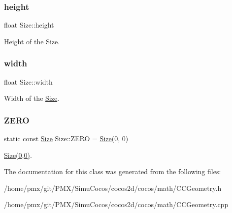 \subsubsection{\texorpdfstring{height}{height}}
{\footnotesize\ttfamily float Size\+::height}

Height of the \hyperlink{classSize}{Size}. \mbox{\label{classSize_af0be19024ddd79e7843492b3760c21f0}} 
\subsubsection{\texorpdfstring{width}{width}}
{\footnotesize\ttfamily float Size\+::width}

Width of the \hyperlink{classSize}{Size}. \mbox{\label{classSize_a724334f12c8ef877c36b3f69e1257aa7}} 
\subsubsection{\texorpdfstring{Z\+E\+RO}{ZERO}}
{\footnotesize\ttfamily static const \hyperlink{classSize}{Size} Size\+::\+Z\+E\+RO = \hyperlink{classSize}{Size}(0, 0)\hspace{0.3cm}{\ttfamily [static]}}

\hyperlink{classSize}{Size(0,0)}. 

The documentation for this class was generated from the following files\+:\begin{DoxyCompactItemize}
\item 
/home/pmx/git/\+P\+M\+X/\+Simu\+Cocos/cocos2d/cocos/math/C\+C\+Geometry.\+h\item 
/home/pmx/git/\+P\+M\+X/\+Simu\+Cocos/cocos2d/cocos/math/C\+C\+Geometry.\+cpp\end{DoxyCompactItemize}
